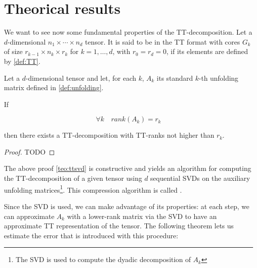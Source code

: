 \section{Theorical results}
We want to see now some fundamental properties of the TT-decomposition. Let \A a $d$-dimensional $n_1 \times \cdots \times n_d$ tensor. It is said to be in the TT format with cores $G_k$ of size $r_{k-1} \times n_k \times r_k$ for $k=1,\ldots ,d$, with $r_0 = r_d = 0$, if its elements are defined by \ref{def:TT}.

\begin{Teo} \label{teo:ttsvd}
  Let \A a $d$-dimensional tensor and let, for each $k$, $A_k$ its standard $k$-th unfolding matrix defined in \ref{def:unfolding}.

  If

  \[
  \forall k \quad rank(A_k) = r_k
  \]
  
  then there exists a TT-decomposition with TT-ranks not higher than $r_k$.

  \begin{proof}
    TODO
  \end{proof}
\end{Teo}

The above proof \ref{teo:ttsvd} is constructive and yields an algorithm for computing the TT-decomposition of a given tensor using $d$ sequential SVDs on the auxiliary unfolding matrices\footnote{The SVD is used to compute the dyadic decomposition of $A_k$}. This  compression algorithm is called .

Since the SVD is used, we can make advantage of its properties: at each step, we can approximate $A_k$ with a lower-rank matrix via the SVD to have an approximate TT representation of the tensor. The following theorem lets us estimate the error that is introduced with this procedure:

